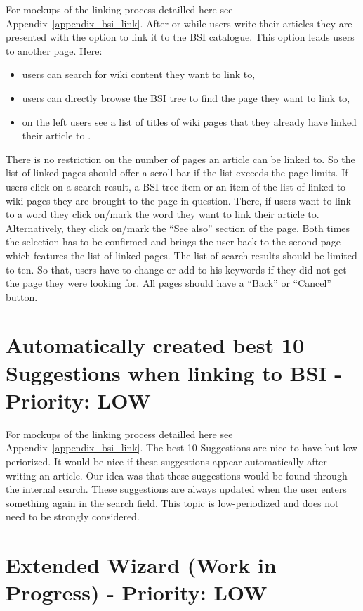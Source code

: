     For mockups of the linking process detailled here see Appendix~\ref{appendix_bsi_link}.
    After or while users write their articles they are presented with the option to link it to the BSI catalogue.
    This option leads users to another page. Here:
    \begin{itemize}

        \item users can search for wiki content they want to link to,
        \item users can directly browse the BSI tree to find the page they want to link to,
        \item on the left  users see a list of titles of wiki pages that they already have linked their article to
            .
    \end{itemize}
    There is no restriction on the number of pages an article can be linked to.
    So the list of linked pages should offer a scroll bar if the list exceeds the page limits.
    If users click on a search result, a BSI tree item or an item of the list of linked to wiki pages they are brought to the page in question.
    There, if users want to link to a word they click on/mark the word they want to link their article to.
    Alternatively, they click on/mark the ``See also'' section of the page.
    Both times the selection has to be confirmed and brings the user back to the second page which features the list of linked pages.
    The list of search results should be limited to ten.
    So that, users have to change or add to his keywords if they did not get the page they were looking for.
    All pages should have a ``Back'' or ``Cancel'' button.  


\section{Automatically created best 10 Suggestions when linking to BSI - Priority: LOW}
   For mockups of the linking process detailled here see Appendix~\ref{appendix_bsi_link}.
   The best 10 Suggestions are nice to have but low periorized. It would be nice if these suggestions appear automatically after writing an article. Our idea was that these suggestions would be found through the internal search. These suggestions are always updated when the user enters something again in the search field. This topic is low-periodized and does not need to be strongly considered.   



\section{Extended Wizard (Work in Progress) - Priority: LOW}

